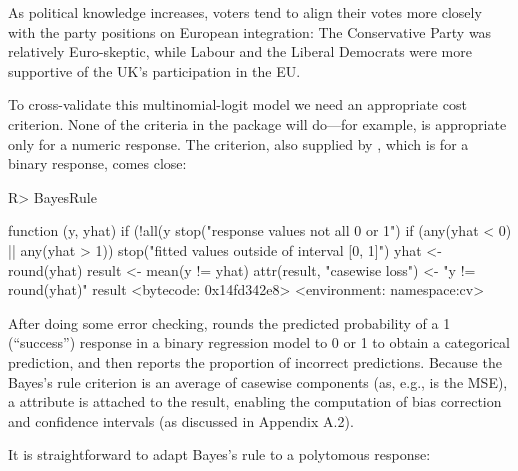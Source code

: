 \documentclass[
]{jss}
\begin{document}
As political knowledge increases, voters tend to align their votes more
closely with the party positions on European integration: The
Conservative Party was relatively Euro-skeptic, while Labour and the
Liberal Democrats were more supportive of the UK's participation in the
EU.

To cross-validate this multinomial-logit model we need an appropriate
cost criterion. None of the criteria in the  package will
do---for example,  is appropriate only for a numeric
response. The  criterion, also supplied by ,
which is for a binary response, comes close:

\begin{CodeChunk}
\begin{CodeInput}
R> BayesRule
\end{CodeInput}
\begin{CodeOutput}
function (y, yhat)
{
    if (!all(y %
        stop("response values not all 0 or 1")
    if (any(yhat < 0) || any(yhat > 1))
        stop("fitted values outside of interval [0, 1]")
    yhat <- round(yhat)
    result <- mean(y != yhat)
    attr(result, "casewise loss") <- "y != round(yhat)"
    result
}
<bytecode: 0x14fd342e8>
<environment: namespace:cv>
\end{CodeOutput}
\end{CodeChunk}

After doing some error checking,  rounds the predicted
probability  of a 1 (``success'') response in a binary
regression model to 0 or 1 to obtain a categorical prediction, and then
reports the proportion of incorrect predictions. Because the Bayes's
rule criterion is an average of casewise components (as, e.g., is the
MSE), a  attribute is attached to the result,
enabling the computation of bias correction and confidence intervals (as
discussed in Appendix A.2).

It is straightforward to adapt Bayes's rule to a polytomous response:
\end{document}
